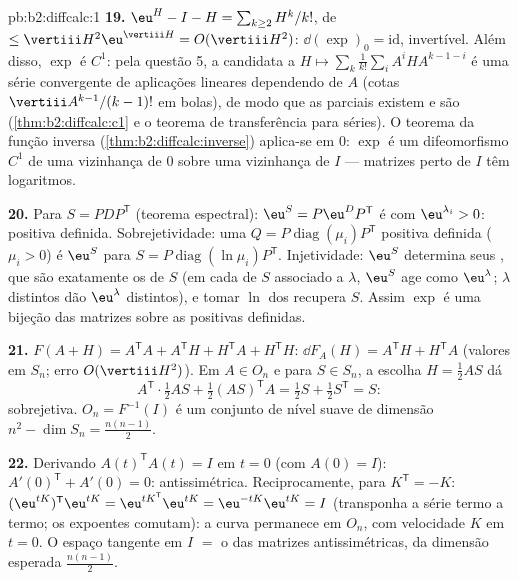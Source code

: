 \begin{solution}{pb:b2:diffcalc:1}
\textbf{19.} $\eu^H - I - H = \sum_{k\geq2}H^k/k!$, de 
$\leq \vertiii H^2\eu^{\vertiii H} = O(\vertiii H^2)$:
$\dd(\exp)_0 = \mathrm{id}$, invertível. Além disso, $\exp$ é
$C^1$: pela questão 5, a candidata a  $H \mapsto
\sum_k\frac1{k!}\sum_iA^iHA^{k-1-i}$ é uma série  convergente
de aplicações lineares dependendo  de $A$ (cotas
$\vertiii A^{k-1}/(k-1)!$ em bolas), de modo que as parciais existem e
são  (\cref{thm:b2:diffcalc:c1} e o teorema de
transferência para séries). O teorema da função inversa
(\cref{thm:b2:diffcalc:inverse}) aplica-se em $0$: $\exp$ é um
difeomorfismo $C^1$ de uma vizinhança de $0$ sobre uma
vizinhança de $I$ --- matrizes perto de $I$ têm logaritmos.

\textbf{20.} Para $S = PDP^{\mathsf T}$  (teorema
espectral): $\eu^S = P\eu^DP^{\mathsf T}$ é  com
 $\eu^{\lambda_i} > 0$: positiva definida.
Sobrejetividade: uma $Q =
P\operatorname{diag}(\mu_i)P^{\mathsf T}$ positiva definida ($\mu_i > 0$) é
$\eu^S$ para $S = P\operatorname{diag}(\ln\mu_i)P^{\mathsf T}$.
Injetividade: $\eu^S$ determina seus , que são
exatamente os de $S$ (em cada  de $S$ associado a $\lambda$,
$\eu^S$ age como $\eu^\lambda$; $\lambda$ distintos dão
$\eu^\lambda$ distintos), e tomar $\ln$ dos 
recupera $S$. Assim $\exp$ é uma bijeção das matrizes 
sobre as positivas definidas.

\textbf{21.} $F(A + H) = A^{\mathsf T}A + A^{\mathsf T}H +
H^{\mathsf T}A + H^{\mathsf T}H$: $\dd F_A(H) =
A^{\mathsf T}H + H^{\mathsf T}A$ (valores em $S_n$; erro
$O(\vertiii H^2)$). Em $A \in O_n$ e para $S \in S_n$, a
escolha $H = \frac12AS$ dá
\[
A^{\mathsf T}\cdot\tfrac12AS + \tfrac12(AS)^{\mathsf T}A
= \tfrac12 S + \tfrac12 S^{\mathsf T} = S :
\]
sobrejetiva. $O_n = F^{-1}(I)$ é um conjunto de nível suave de
dimensão $n^2 - \dim S_n = \frac{n(n-1)}2$.

\textbf{22.} Derivando $A(t)^{\mathsf T}A(t) = I$ em $t
= 0$ (com $A(0) = I$): $A'(0)^{\mathsf T} + A'(0) = 0$:
antissimétrica. Reciprocamente, para $K^{\mathsf T} = -K$:
$(\eu^{tK})^{\mathsf T}\eu^{tK} = \eu^{tK^{\mathsf T}}
\eu^{tK} = \eu^{-tK}\eu^{tK} = I$ (transponha a série
termo a termo; os expoentes comutam): a curva permanece em $O_n$,
com velocidade $K$ em $t = 0$. O espaço tangente em $I$ $=$ o das
matrizes antissimétricas, da dimensão esperada
$\frac{n(n-1)}2$.


\end{solution}
